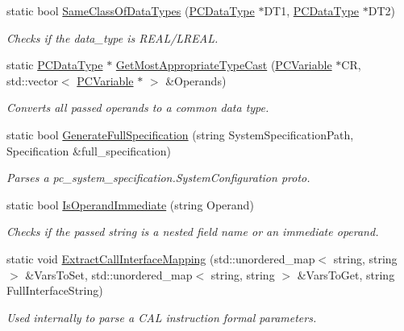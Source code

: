 \begin{DoxyCompactItemize}
\item 
static bool \hyperlink{classpc__emulator_1_1Utils_a47bc7ad0d941b0256dd00fa21822c28c}{Same\+Class\+Of\+Data\+Types} (\hyperlink{classpc__emulator_1_1PCDataType}{P\+C\+Data\+Type} $\ast$D\+T1, \hyperlink{classpc__emulator_1_1PCDataType}{P\+C\+Data\+Type} $\ast$D\+T2)\hypertarget{classpc__emulator_1_1Utils_a47bc7ad0d941b0256dd00fa21822c28c}{}\label{classpc__emulator_1_1Utils_a47bc7ad0d941b0256dd00fa21822c28c}

\begin{DoxyCompactList}\small\item\em Checks if the data\+\_\+type is R\+E\+A\+L/\+L\+R\+E\+AL. \end{DoxyCompactList}\item 
static \hyperlink{classpc__emulator_1_1PCDataType}{P\+C\+Data\+Type} $\ast$ \hyperlink{classpc__emulator_1_1Utils_afb4ce66f03d351d7fb7bf0632cce5ed7}{Get\+Most\+Appropriate\+Type\+Cast} (\hyperlink{classpc__emulator_1_1PCVariable}{P\+C\+Variable} $\ast$CR, std\+::vector$<$ \hyperlink{classpc__emulator_1_1PCVariable}{P\+C\+Variable} $\ast$ $>$ \&Operands)
\begin{DoxyCompactList}\small\item\em Converts all passed operands to a common data type. \end{DoxyCompactList}\item 
static bool \hyperlink{classpc__emulator_1_1Utils_ad155603916c2f69e6660378990dfed1d}{Generate\+Full\+Specification} (string System\+Specification\+Path, Specification \&full\+\_\+specification)
\begin{DoxyCompactList}\small\item\em Parses a pc\+\_\+system\+\_\+specification.\+System\+Configuration proto. \end{DoxyCompactList}\item 
static bool \hyperlink{classpc__emulator_1_1Utils_af4f9529c4bf826187c06328dfd210c8b}{Is\+Operand\+Immediate} (string Operand)\hypertarget{classpc__emulator_1_1Utils_af4f9529c4bf826187c06328dfd210c8b}{}\label{classpc__emulator_1_1Utils_af4f9529c4bf826187c06328dfd210c8b}

\begin{DoxyCompactList}\small\item\em Checks if the passed string is a nested field name or an immediate operand. \end{DoxyCompactList}\item 
static void \hyperlink{classpc__emulator_1_1Utils_a30fe3b319a10dc00a5805a5eba020998}{Extract\+Call\+Interface\+Mapping} (std\+::unordered\+\_\+map$<$ string, string $>$ \&Vars\+To\+Set, std\+::unordered\+\_\+map$<$ string, string $>$ \&Vars\+To\+Get, string Full\+Interface\+String)\hypertarget{classpc__emulator_1_1Utils_a30fe3b319a10dc00a5805a5eba020998}{}\label{classpc__emulator_1_1Utils_a30fe3b319a10dc00a5805a5eba020998}

\begin{DoxyCompactList}\small\item\em Used internally to parse a C\+AL instruction formal parameters. \end{DoxyCompactList}\end{DoxyCompactItemize}


